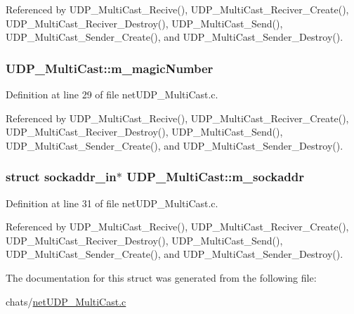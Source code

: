 Referenced by U\+D\+P\+\_\+\+Multi\+Cast\+\_\+\+Recive(), U\+D\+P\+\_\+\+Multi\+Cast\+\_\+\+Reciver\+\_\+\+Create(), U\+D\+P\+\_\+\+Multi\+Cast\+\_\+\+Reciver\+\_\+\+Destroy(), U\+D\+P\+\_\+\+Multi\+Cast\+\_\+\+Send(), U\+D\+P\+\_\+\+Multi\+Cast\+\_\+\+Sender\+\_\+\+Create(), and U\+D\+P\+\_\+\+Multi\+Cast\+\_\+\+Sender\+\_\+\+Destroy().

\subsubsection[{\texorpdfstring{m\+\_\+magic\+Number}{m_magicNumber}}]{ U\+D\+P\+\_\+\+Multi\+Cast\+::m\+\_\+magic\+Number}\hypertarget{structUDP__MultiCast_a302e6559f2c43ceb1c1717df6d85a5af}{}\label{structUDP__MultiCast_a302e6559f2c43ceb1c1717df6d85a5af}


Definition at line 29 of file net\+U\+D\+P\+\_\+\+Multi\+Cast.\+c.



Referenced by U\+D\+P\+\_\+\+Multi\+Cast\+\_\+\+Recive(), U\+D\+P\+\_\+\+Multi\+Cast\+\_\+\+Reciver\+\_\+\+Create(), U\+D\+P\+\_\+\+Multi\+Cast\+\_\+\+Reciver\+\_\+\+Destroy(), U\+D\+P\+\_\+\+Multi\+Cast\+\_\+\+Send(), U\+D\+P\+\_\+\+Multi\+Cast\+\_\+\+Sender\+\_\+\+Create(), and U\+D\+P\+\_\+\+Multi\+Cast\+\_\+\+Sender\+\_\+\+Destroy().

\subsubsection[{\texorpdfstring{m\+\_\+sockaddr}{m_sockaddr}}]{\setlength{\rightskip}{0pt plus 5cm}struct sockaddr\+\_\+in$\ast$ U\+D\+P\+\_\+\+Multi\+Cast\+::m\+\_\+sockaddr}\hypertarget{structUDP__MultiCast_a77b48c8d6a168eb7be239211367f8ca3}{}\label{structUDP__MultiCast_a77b48c8d6a168eb7be239211367f8ca3}


Definition at line 31 of file net\+U\+D\+P\+\_\+\+Multi\+Cast.\+c.



Referenced by U\+D\+P\+\_\+\+Multi\+Cast\+\_\+\+Recive(), U\+D\+P\+\_\+\+Multi\+Cast\+\_\+\+Reciver\+\_\+\+Create(), U\+D\+P\+\_\+\+Multi\+Cast\+\_\+\+Reciver\+\_\+\+Destroy(), U\+D\+P\+\_\+\+Multi\+Cast\+\_\+\+Send(), U\+D\+P\+\_\+\+Multi\+Cast\+\_\+\+Sender\+\_\+\+Create(), and U\+D\+P\+\_\+\+Multi\+Cast\+\_\+\+Sender\+\_\+\+Destroy().



The documentation for this struct was generated from the following file\+:\begin{DoxyCompactItemize}
\item 
chats/\hyperlink{netUDP__MultiCast_8c}{net\+U\+D\+P\+\_\+\+Multi\+Cast.\+c}\end{DoxyCompactItemize}
